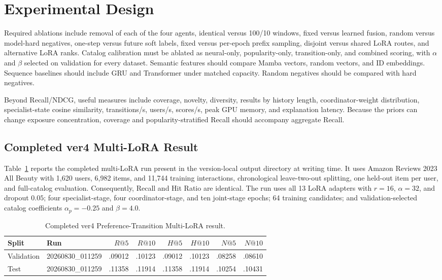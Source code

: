 \documentclass[11pt,a4paper]{article}
\begin{document}
\section{Experimental Design}

Required ablations include removal of each of the four agents, identical
versus 100/10 windows, fixed versus learned fusion, random versus model-hard
negatives, one-step versus future soft labels, fixed versus per-epoch prefix
sampling, disjoint versus shared LoRA routes, and alternative LoRA ranks.
Catalog calibration must be ablated as neural-only, popularity-only,
transition-only, and combined scoring, with $\alpha$ and $\beta$ selected on
validation for every dataset. Semantic features should compare Mamba vectors,
random vectors, and ID embeddings. Sequence baselines should include GRU and
Transformer under matched capacity. Random negatives should be compared with
hard negatives.

Beyond Recall/NDCG, useful measures include coverage, novelty, diversity,
results by history length, coordinator-weight distribution, specialist-state
cosine similarity, transitions/s, users/s, scores/s, peak GPU memory, and
explanation latency. Because the priors can change exposure concentration,
coverage and popularity-stratified Recall should accompany aggregate Recall.

\subsection{Completed ver4 Multi-LoRA Result}

Table~\ref{tab:ver4-current} reports the completed multi-LoRA run present in
the version-local output directory at writing time. It uses Amazon Reviews 2023
All Beauty with 1,620 users, 6,982 items, and 11,744 training interactions,
chronological leave-two-out splitting, one held-out item per user, and
full-catalog evaluation. Consequently, Recall and Hit Ratio are identical.
The run uses all 13 LoRA adapters with $r=16$, $\alpha=32$, and dropout $0.05$;
four specialist-stage, four coordinator-stage, and ten joint-stage epochs; 64 training candidates;
and validation-selected catalog coefficients $\alpha_p=-0.25$ and $\beta=4.0$.

\begin{table}[H]
\centering
\caption{Completed ver4 Preference-Transition Multi-LoRA result.}
\label{tab:ver4-current}
\footnotesize
\begin{tabular}{@{}llrrrrrr@{}}
\toprule
Split & Run & $R@5$ & $R@10$ & $H@5$ & $H@10$ & $N@5$ & $N@10$\\
\midrule
Validation & 20260830\_011259 & .09012 & .10123 & .09012 & .10123 & .08258 & .08610\\
Test & 20260830\_011259 & .11358 & .11914 & .11358 & .11914 & .10254 & .10431\\
\bottomrule
\end{tabular}
\end{table}
\end{document}
